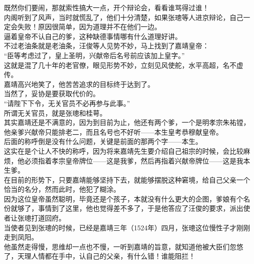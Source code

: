 \begin{multicols}{\theparacolNo}
既然你们要闹，那就索性搞大一点，开个辩论会，看看谁骂得过谁！\\

内阁听到了风声，当时就慌乱了，他们十分清楚，如果张璁等人进京辩论，自己一定会失败！原因很简单，因为道理并不在他们一边。\\

逼着皇帝不认自己的爹，这种缺德事情哪有什么道理好讲。\\

不过老油条就是老油条，汪俊等人见势不妙，马上找到了嘉靖皇帝：\\

“臣等考虑过了，皇上圣明，兴献帝后名号前应该加上皇字。”\\

这就是混了几十年的老官僚，眼见形势不妙，立刻见风使舵，水平高超，名不虚传。\\

嘉靖高兴地笑了，他苦苦追求的目标终于达到了。\\

当然了，妥协是要获取代价的。\\

“请陛下下令，无关官员不必再参与此事。”\\

所谓无关官员，就是张璁和桂萼。\\

其实嘉靖还是不满意的，因为到目前为止，他还有两个爹，一个是明孝宗朱祐镗，他亲爹兴献帝只能排老二，而且名号也不好听——本生皇考恭穆献皇帝。\\

后面的称呼倒是没有什么问题，关键是前面的那两个字——本生。\\

这实在是个让人不快的称呼，因为将来嘉靖先生要介绍自己祖宗的时候，会比较麻烦，他必须指着孝宗皇帝牌位——这是我爹，然后再指着兴献帝牌位——这是我本生爹。\\

在目前的形势下，只要嘉靖能够坚持下去，就能够摆脱这种窘境，给自己父亲一个恰当的名分，然而此时，他犯了糊涂。\\

因为这位皇帝虽然聪明，毕竟还是个孩子，本就没有什么更大的企图，爹娘有个名份就够了，事情到了这里，他也觉得差不多了，于是他答应了汪俊的要求，派出使者让张璁打道回府。\\

当使者见到张璁的时候，已经是嘉靖三年（1524年）四月，张璁这位慢性子才刚刚走到凤阳。\\

他虽然走得慢，思维却一点也不慢，一听到嘉靖的旨意，就知道他被大臣们忽悠了，天理人情都在手中，认自己的父亲，有什么错！谁能阻拦！\\


\end{multicols}
